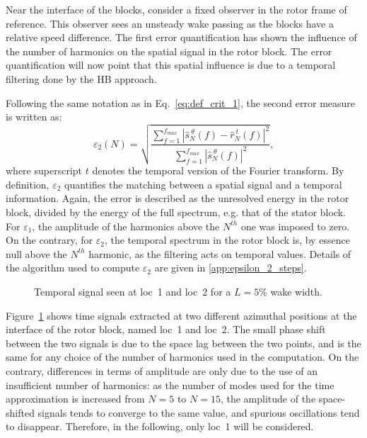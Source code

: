 Near the interface of the blocks, consider a fixed observer in
the rotor frame of reference. This observer sees an unsteady 
wake passing as the blocks have a relative speed difference.
The first error quantification has shown the 
influence of the number of harmonics on the spatial signal 
in the rotor block. The error quantification will now
point that this spatial influence is due to a temporal filtering done by
the HB approach.

Following the same notation as in Eq.~\eqref{eq:def_crit_1}, 
the second error measure is written as:
\begin{equation}
    \varepsilon_2(N) = \sqrt{
    \frac{\sum_{f=1}^{f_{max}} | \widehat{s}^{~\theta}_N (f) - 
      \widehat{r}^{~t}_N (f)|^2}{ 
    \sum_{f=1}^{f_{max}} | \widehat{s}^{~\theta}_N (f)|^2}},
    \label{eq:def_crit_2}
\end{equation}
where superscript $t$ denotes the temporal version of
the Fourier transform.
By definition, $\varepsilon_2$
quantifies the matching between a spatial signal
and a temporal information.
Again, the error is described as the unresolved energy 
in the rotor block, 
divided by the energy of the full spectrum, 
e.g. that of the stator block. 
For $\varepsilon_1$, the amplitude 
of the harmonics above the $N^{th}$ one was imposed to zero. 
On the contrary, for $\varepsilon_2$, the temporal spectrum 
in the rotor block is, 
by essence null above the $N^{th}$ harmonic, as the filtering 
acts on temporal values. 
Details of the algorithm used to compute $\varepsilon_2$ are given in \ref{app:epsilon_2_steps}.

\begin{figure}[htp]
\centering
  \caption{Temporal signal seen at loc~1 and loc~2 for a $L=5\%$ wake width.}
  \label{fig:temp_signal}
\end{figure}
Figure~\ref{fig:temp_signal} shows time signals
extracted at two different azimuthal positions at 
the interface of the rotor block, named loc~1 and loc~2. 
The small phase shift between the two 
signals is due to the space lag between the two points, 
and is the same for any choice of the number of 
harmonics used in the computation. On the contrary, 
differences in terms of amplitude are only due 
to the use of an insufficient number of harmonics: 
as the number of modes used for the time 
approximation is increased from $N=5$ to $N=15$, 
the amplitude of the space-shifted signals 
tends to converge to the same value, and 
spurious oscillations tend to disappear. Therefore, in the following,
only loc~1 will be considered.

